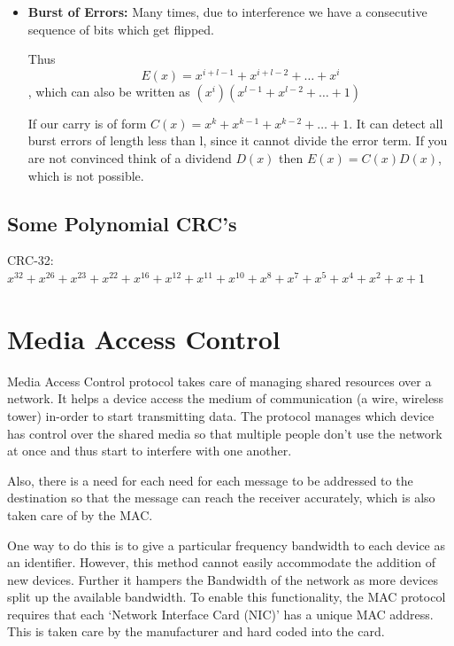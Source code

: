 \documentclass[12pt]{article}
\newcommand{\tbox}[1]{\noindent\fbox{\parbox{\textwidth}{#1}}}
\begin{document}
\begin{itemize}
    \item \textbf{Burst of Errors:}
    Many times, due to interference we have a consecutive sequence of bits which get flipped. 

    Thus \[E(x) = x^{i + l -1} + x^{i + l -2} + \dots + x^i\], which can also be 
    written as \((x^i)(x^{l-1} + x^{l-2} + \dots+ 1)\)

    If our carry is of form \(C(x) = x^k + x^{k-1} + x^{k-2} + \dots + 1\). 
    It can detect all burst errors of length less than l, since it cannot divide the error term. 
    If you are not convinced think of a dividend \(D(x)\) then \(E(x) = C(x)D(x)\), which is not possible. 
\end{itemize}
\subsection{Some Polynomial CRC's}

CRC-32: \(x^{32} + x^{26} + x^{23} + x^{22} + x^{16} + x^{12} + x^{11} + x^{10} + x^{8} + x^{7} + x^{5} + x^{4} + x^{2} + x + 1 \)


\noindent\tbox{
    \begin{center}
    \textbf{\Huge Lecture 12}
    \end{center}
}
\section{Media Access Control}

Media Access Control protocol takes care of managing shared resources over a network. It helps 
a device access the medium of communication (a wire, wireless tower) in-order to start transmitting data. 
The protocol manages which device has control over the shared media so that multiple people don't use the network at once and thus 
start to interfere with one another. 

Also, there is a need for each need for each message to be addressed to the destination so that 
the message can reach the receiver accurately, which is also taken care of by the MAC.

One way to do this is to give a particular frequency bandwidth to each device as an identifier. 
However, this method cannot easily accommodate the addition of new devices. Further it hampers the Bandwidth of the network as more 
devices split up the available bandwidth.  
To enable this functionality, the MAC protocol requires that each `Network Interface Card (NIC)' has a
unique MAC address. This is taken care by the manufacturer and hard coded into the card. 
\end{document}
